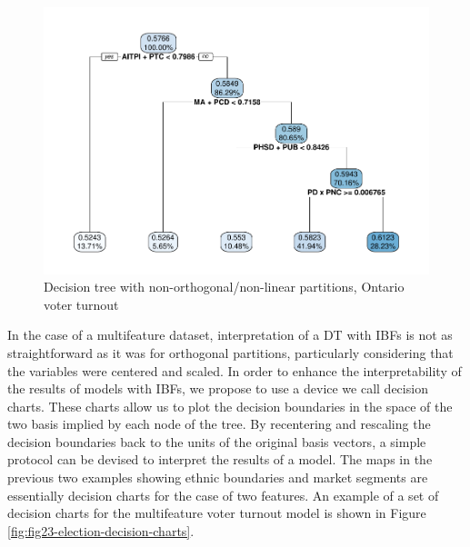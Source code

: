 \documentclass[]{elsarticle} %
\makeatletter
\def\maxwidth{\ifdim\Gin@nat@width>\linewidth\linewidth
\else\Gin@nat@width\fi}
\let\Oldincludegraphics\includegraphics
\renewcommand{\includegraphics}[1]{\Oldincludegraphics[width=\maxwidth]{#1}}
\makeatother
\begin{document}
\begin{figure}
\centering
\includegraphics{Trees_with_Base_Functions_v2_files/figure-latex/fig22-tree-basis-election-1.pdf}
\caption{\label{fig:fig22-tree-basis-election}Decision tree with
non-orthogonal/non-linear partitions, Ontario voter turnout}
\end{figure}

In the case of a multifeature dataset, interpretation of a DT with IBFs
is not as straightforward as it was for orthogonal partitions,
particularly considering that the variables were centered and scaled. In
order to enhance the interpretability of the results of models with
IBFs, we propose to use a device we call decision charts. These charts
allow us to plot the decision boundaries in the space of the two basis
implied by each node of the tree. By recentering and rescaling the
decision boundaries back to the units of the original basis vectors, a
simple protocol can be devised to interpret the results of a model. The
maps in the previous two examples showing ethnic boundaries and market
segments are essentially decision charts for the case of two features.
An example of a set of decision charts for the multifeature voter
turnout model is shown in Figure
\ref{fig:fig23-election-decision-charts}.
\end{document}
